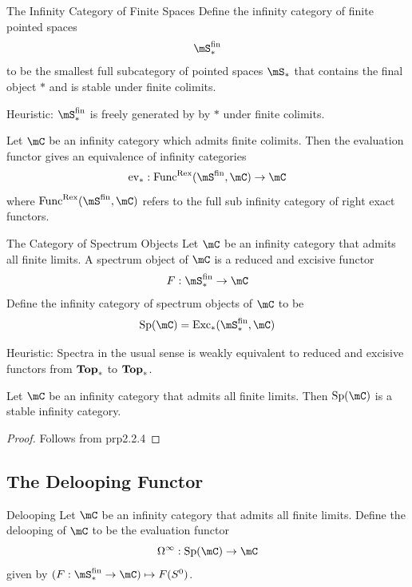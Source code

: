 \documentclass[a4paper]{article}
\begin{document}
\begin{defn}{The Infinity Category of Finite Spaces}{} Define the infinity category of finite pointed spaces $$\mS_\ast^\text{fin}$$ to be the smallest full subcategory of pointed spaces $\mS_\ast$ that contains the final object $\ast$ and is stable under finite colimits. 
\end{defn}

Heuristic: $\mS_\ast^\text{fin}$ is freely generated by by $\ast$ under finite colimits. 

\begin{lmm}{}{} Let $\mC$ be an infinity category which admits finite colimits. Then the evaluation functor gives an equivalence of infinity categories $$\text{ev}_\ast:\text{Func}^\text{Rex}(\mS^\text{fin},\mC)\to\mC$$ where $\text{Func}^\text{Rex}(\mS^\text{fin},\mC)$ refers to the full sub infinity category of right exact functors. 
\end{lmm}

\begin{defn}{The Category of Spectrum Objects}{} Let $\mC$ be an infinity category that admits all finite limits. A spectrum object of $\mC$ is a reduced and excisive functor $$F:\mS_\ast^\text{fin}\to\mC$$ Define the infinity category of spectrum objects of $\mC$ to be $$\text{Sp}(\mC)=\text{Exc}_\ast(\mS_\ast^\text{fin},\mC)$$
\end{defn}

Heuristic: Spectra in the usual sense is weakly equivalent to reduced and excisive functors from $\bold{Top}_\ast$ to $\bold{Top}_\ast$. 

\begin{lmm}{}{} Let $\mC$ be an infinity category that admits all finite limits. Then $\text{Sp}(\mC)$ is a stable infinity category. 
\begin{proof}
Follows from prp2.2.4
\end{proof}
\end{lmm}

\subsection{The Delooping Functor}
\begin{defn}{Delooping}{} Let $\mC$ be an infinity category that admits all finite limits. Define the delooping of $\mC$ to be the evaluation functor $$\Omega^\infty:\text{Sp}(\mC)\to\mC$$ given by $(F:\mS_\ast^\text{fin}\to\mC)\mapsto F(S^0)$. 
\end{defn}
\end{document}
